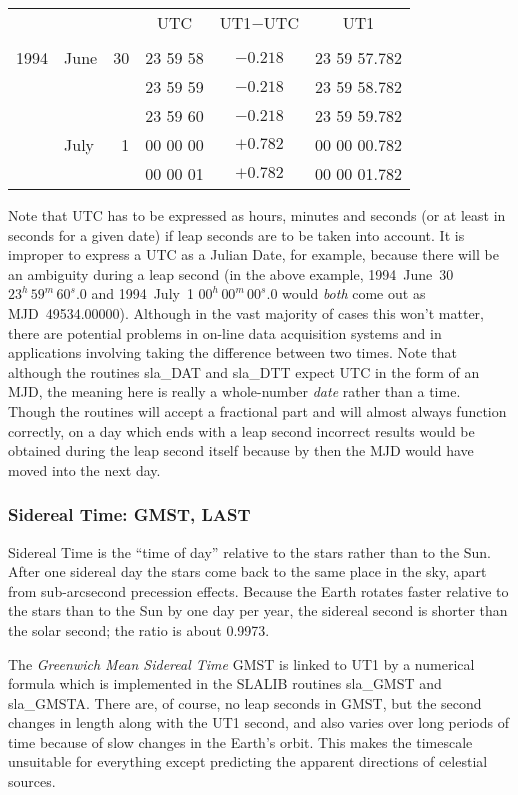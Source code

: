 \documentclass[11pt,twoside]{article}
\newcommand{\tseci}[1]   {$#1$\mbox{$^{\rm s}$}}
\newcommand{\tsec}[2]    {\tseci{#1}$\hspace{-0.3em}.#2$}
\renewcommand{\tsec}[2] {$#1^{\rm s}\hspace{-0.3em}.#2$}
\newcommand{\hms}[4]    {$#1^{\rm h}\,#2^{\rm m}\,$\tsec{#3}{#4}}
\renewcommand{\hms}[4] {$#1^{h}\,#2^{m}\,#3^{s}.#4$}
\begin{document}
\hspace{3em}
\begin{tabular}{clrccc} \\
     &      &    &   UTC    & UT1$-$UTC  &    UT1       \\ \\
1994 & June & 30 & 23 59 58 & $-0.218$ & 23 59 57.782 \\
     &      &    & 23 59 59 & $-0.218$ & 23 59 58.782 \\
     &      &    & 23 59 60 & $-0.218$ & 23 59 59.782 \\
     & July &  1 & 00 00 00 & $+0.782$ & 00 00 00.782 \\
     &      &    & 00 00 01 & $+0.782$ & 00 00 01.782 \\
\end{tabular}

Note that UTC has to be expressed as hours, minutes and
seconds (or at least in seconds for a given date) if leap seconds
are to be taken into account.  It is improper to express a UTC as a
Julian Date, for example, because there will be an ambiguity
during a leap second (in the above example,
1994~June~30 \hms{23}{59}{60}{0} and
1994~July~1 \hms{00}{00}{00}{0} would {\it both}\/ come out as
MJD~49534.00000).  Although in the vast majority of
cases this won't matter, there are potential problems in
on-line data acquisition systems and in applications involving
taking the difference between two times.  Note that although the routines
sla\_DAT
and
sla\_DTT
expect UTC in the form of an MJD, the meaning here is really a
whole-number {\it date}\/ rather than a time.  Though the routines will accept
a fractional part and will almost always function correctly, on a day
which ends with a leap
second incorrect results would be obtained during the leap second
itself because by then the MJD would have moved into the next day.

\subsubsection{Sidereal Time: GMST, LAST}
Sidereal Time is the ``time of day'' relative to the
stars rather than to the Sun.  After
one sidereal day the stars come back to the same place in the
sky, apart from sub-arcsecond precession effects.  Because the Earth
rotates faster relative to the stars than to the Sun by one day
per year, the sidereal second is shorter than the solar
second; the ratio is about 0.9973.

The {\it Greenwich Mean Sidereal Time}\/ GMST is
linked to UT1 by a numerical formula which
is implemented in the SLALIB routines
sla\_GMST
and
sla\_GMSTA.
There are, of course, no leap seconds in GMST, but the second
changes in length along with the UT1 second, and also varies
over long periods of time because of slow changes in the Earth's
orbit.  This makes the timescale unsuitable for everything except
predicting the apparent directions of celestial sources.
\end{document}
